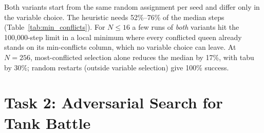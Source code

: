 \documentclass[conference]{IEEEtran}
\begin{document}
\begin{table}[htbp]
\caption{Min-Conflicts: Standard vs. Proposed Heuristic (200 Runs per $N$, Same Initial States)}
\label{tab:min_conflicts}
\centering
{}
\end{table}

Both variants start from the same random assignment per seed and differ only in the variable choice. The heuristic needs 52\%--76\% of the median steps (Table~\ref{tab:min_conflicts}). For $N\le 16$ a few runs of \emph{both} variants hit the 100,000-step limit in a local minimum where every conflicted queen already stands on its min-conflicts column, which no variable choice can leave. At $N=256$, most-conflicted selection alone reduces the median by 17\%, with tabu by 30\%; random restarts (outside variable selection) give 100\% success.

\section{Task 2: Adversarial Search for Tank Battle}
\end{document}
